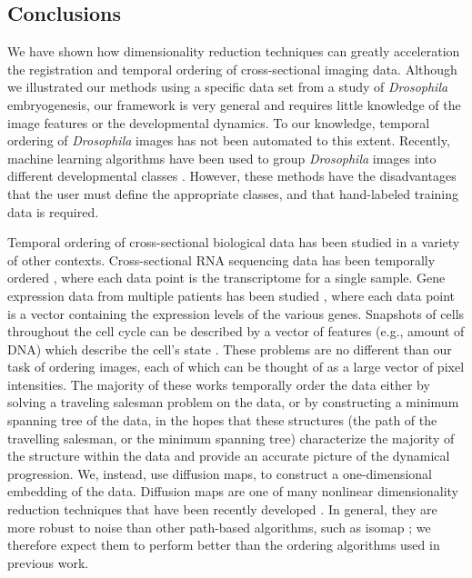 \documentclass{pnastwo}
\begin{document}
\begin{article}
\section{Conclusions}

We have shown how dimensionality reduction techniques can greatly acceleration the registration and temporal ordering of cross-sectional imaging data.
%
Although we illustrated our methods using a specific data set from a study of {\em Drosophila} embryogenesis, our framework is very general and requires little knowledge of the image features or the developmental dynamics.
%
To our knowledge, temporal ordering of {\em Drosophila} images has not been automated to this extent.
%
Recently, machine learning algorithms have been used to group {\em Drosophila} images into different developmental classes \cite{yuan2014automated}.
%
However, these methods have the disadvantages that the user must define the appropriate classes, and that hand-labeled training data is required.

Temporal ordering of cross-sectional biological data has been studied in a variety of other contexts.
%
Cross-sectional RNA sequencing data has been temporally ordered \cite{anavy2014blind}, where each data point is the transcriptome for a single sample.
%
Gene expression data from multiple patients has been studied \cite{gupta2008extracting} \cite{qiu2011discovering},
%
where each data point is a vector containing the expression levels of the various genes.
%
Snapshots of cells throughout the cell cycle can be described by a vector of features (e.g., amount of DNA) which describe the cell's state  \cite{kafri2013dynamics}.
%
These problems are no different than our task of ordering images, each of which can be thought of as a large vector of pixel intensities. 
%
The majority of these works temporally order the data either by solving a traveling salesman problem on the data, or by constructing a minimum spanning tree of the data, 
in the hopes that these structures (the path of the travelling salesman, or the minimum spanning tree) characterize the majority of the structure within the data and provide an accurate picture of the dynamical progression.
%
We, instead, use diffusion maps, to construct a one-dimensional embedding of the data.
%
Diffusion maps are one of many nonlinear dimensionality reduction techniques that have been recently developed \cite{Belkin2003} \cite{tenenbaum2000global} \cite{Donoho2003} \cite{Roweis2000}.
%
In general, they are more robust to noise than other path-based algorithms, such as isomap \cite{balasubramanian2002isomap}; we therefore expect them to perform better than the ordering algorithms used in previous work.
%
%


\end{article}
\end{document}
